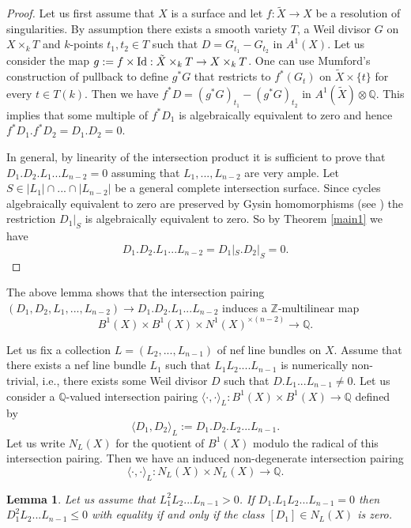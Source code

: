 \documentclass[12pt]{article}
\theoremstyle{plain}
\newtheorem{Lemma}[Thm]{\sc Lemma}
\theoremstyle{definition}
\theoremstyle{remark}
\newcommand{\ZZ}{{\mathbb Z}}
\newcommand{\QQ}{{\mathbb Q}}
\newcommand{\id}{\mathop{\rm Id}}
\begin{document}
\begin{proof}
Let us first assume that $X$ is a surface and let $f: \tilde X\to X$ be a resolution of singularities. By assumption there exists a smooth variety $T$, a Weil divisor $G$ on $X\times _kT$ and $k$-points $t_1,t_2\in T$ such that $D= G_{t_1}-G_{t_2}$ in $A^1(X)$. 
Let us consider the map $g:=f\times \id : \tilde X\times _kT\to X \times_k T$. One can use Mumford's construction of pullback to define  $g^*G$ that restricts to $f^*(G_t)$ on $\tilde X\times \{t\}$
for every $t\in T(k)$.
Then we have $f^*D= (g^*G)_{t_1}-(g^*G)_{t_2}$ in $A^1(\tilde X)\otimes \QQ$. This implies  that some multiple of $f^* D_1$ is algebraically equivalent to zero and hence $f^*D_1.f^*D_2=D_1.D_2=0$. 
	
	
	In general, by linearity of the intersection product it is sufficient to prove that  $D_1.D_2.L_1...L_{n-2}=0$ assuming that $L_1,..., L_{n-2}$ are very ample.
Let $S\in |L_1|\cap ...\cap |L_{n-2}|$ be a general complete intersection surface.
Since cycles algebraically equivalent to zero are preserved by  Gysin homomorphisms (see \cite[Proposition 10.3]{Fu}) the restriction $D_1|_S$ is algebraically equivalent to zero.
So by Theorem \ref{main1} we have
$$D_1.D_2.L_1...L_{n-2} =D_1|_S.D_2|_S=0.$$
\end{proof}


The above lemma shows that the intersection pairing $(D_1, D_2, L_1,... ,L_{n-2})\to D_1.D_2.L_1...L_{n-2}$ induces a $\ZZ$-multilinear map 
$$B^1(X)\times B^1(X)\times N^1(X)^{\times (n-2)}\to \QQ .$$

\medskip

Let us fix  a collection $L=(L_2,...,L_{n-1})$ of nef line bundles on $X$.
Assume that there exists a nef line bundle $L_1$ such that $L_1L_2....L_{n-1}$ is numerically non-trivial, i.e., there exists some Weil divisor $D$ such that $D.L_1...L_{n-1}\ne 0$. Let us consider a $\QQ$-valued intersection pairing $\langle \cdot, \cdot \rangle _L : B^1(X)\times B^1(X) \to \QQ$ defined by
$$\langle D_1, D_2\rangle _L:= D_1.D_2.L_2...L_{n-1} .$$
Let us write $N_L(X)$ for the quotient of $B^1 (X)$ modulo the radical of this intersection pairing. 
Then we have an induced non-degenerate intersection pairing
$$\langle \cdot, \cdot \rangle _L: N_L(X)\times N_L(X)\to \QQ.$$



\begin{Lemma}\label{easy-HIT}
	Let us assume that $L_1^2L_2...L_{n-1}>0$. If  $D_1.L_1L_2...L_{n-1}=0$ then  $D_1^2L_2...L_{n-1}\le 0$
	with equality if and only if the class $[D_1]\in N_L(X)$ is zero.
\end{Lemma}
\end{document}
